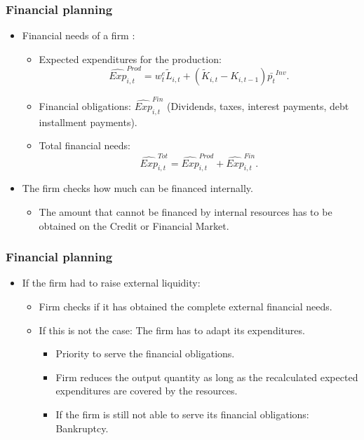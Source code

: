 \documentclass{beamer}
\begin{document}
\frame
{

  \frametitle{Financial planning} 
\begin{itemize}

\item Financial needs of a firm :
\begin{itemize}
	\item  Expected expenditures for the production: 
	\[
	\hat{Exp}^{Prod}_{i,t}= w_t^e \tilde L_{i,t} + (\tilde{K}_{i,t}-K_{i,t-1})\bar{p_{t}}^{Inv}.
	\]

	\item Financial obligations: $\hat{Exp}^{Fin}_{i,t}$ (Dividends, taxes, interest payments, debt installment payments).
	
	 \item Total financial needs: 
	 \[
	 \hat{Exp}^{Tot}_{i,t}= \hat{Exp}^{Prod}_{i,t} + \hat{Exp}^{Fin}_{i,t}.
	 \]
\end{itemize}

\item The firm checks how much can be financed internally.
\begin{itemize}
	\item The amount that cannot be financed by internal resources has to be obtained on the Credit or Financial Market. 
\end{itemize}
  




\end{itemize}

}
\frame
{

  \frametitle{Financial planning} 
\begin{itemize}

\item If the firm had to raise external liquidity:
\begin{itemize}
	\item Firm checks if it has obtained the complete external financial needs.
	\item If this is not the case: The firm has to adapt its expenditures.
	
\begin{itemize}
	\item Priority to serve the financial obligations.
	\item Firm reduces the output quantity as long as the recalculated expected expenditures are covered by the resources.
	\item If the firm is still not able to serve its financial obligations: Bankruptcy.   
\end{itemize}
\end{itemize}
 
\end{itemize}
  
}
\end{document}
